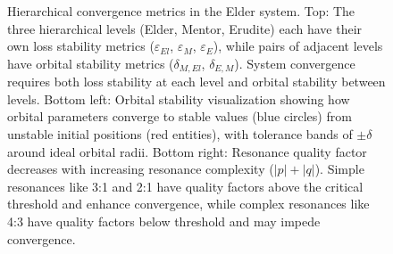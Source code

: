 \begin{figure}[t]
\caption{Hierarchical convergence metrics in the Elder system. Top: The three hierarchical levels (Elder, Mentor, Erudite) each have their own loss stability metrics ($\varepsilon_{El}$, $\varepsilon_{M}$, $\varepsilon_{E}$), while pairs of adjacent levels have orbital stability metrics ($\delta_{M,El}$, $\delta_{E,M}$). System convergence requires both loss stability at each level and orbital stability between levels. Bottom left: Orbital stability visualization showing how orbital parameters converge to stable values (blue circles) from unstable initial positions (red entities), with tolerance bands of $\pm\delta$ around ideal orbital radii. Bottom right: Resonance quality factor decreases with increasing resonance complexity ($|p|+|q|$). Simple resonances like 3:1 and 2:1 have quality factors above the critical threshold and enhance convergence, while complex resonances like 4:3 have quality factors below threshold and may impede convergence.}
\label{fig:hierarchical_convergence}
\end{figure}